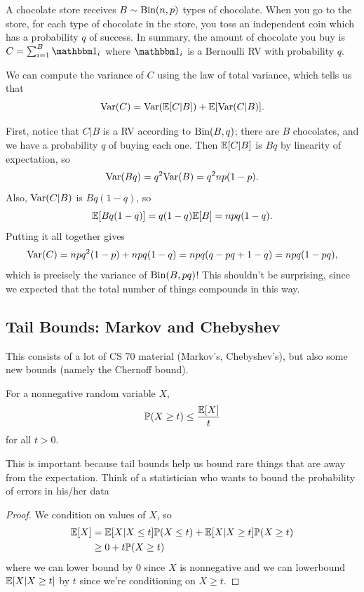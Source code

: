 \documentclass[11 pt]{scrartcl}
\begin{document}
\begin{example}
    A chocolate store receives $B\sim \text{Bin}(n,p)$ types of chocolate. When you go to the store, for each type of chocolate in the store, you toss an independent coin which has a probability $q$ of success. In summary, the amount of chocolate you buy is $C = \sum_{i = 1}^B \one_i$ where $\one_i$ is a Bernoulli RV with probability $q$. 

    We can compute the variance of $C$ using the law of total variance, which tells us that 
    \[ \text{Var}(C) = \text{Var}(\mathbb E[C|B]) + \mathbb E[\text{Var}(C|B)].\] 
    
    First, notice that $C|B$ is a RV according to $\text{Bin}(B, q)$; there are $B$ chocolates, and we have a probability $q$ of buying each one. Then $\mathbb E[C|B]$ is $Bq$ by linearity of expectation, so 
    \[ \text{Var}(Bq) = q^2\text{Var}(B) = q^2np(1-p).\] 
    Also, $\text{Var}(C|B)$ is $Bq(1-q)$, so 
    \[ \mathbb E[Bq(1-q)] = q(1-q)\mathbb E[B] = npq(1-q).\] 
    Putting it all together gives 
    \[ \text{Var}(C) = npq^2(1-p) + npq(1-q) = npq(q-pq + 1-q) = npq(1-pq),\]
    which is precisely the variance of $\text{Bin}(B, pq)$! This shouldn't be surprising, since we expected that the total number of things compounds in this way. 
\end{example}

\subsection{Tail Bounds: Markov and Chebyshev}
This consists of a lot of CS 70 material (Markov's, Chebyshev's), but also some new bounds (namely the Chernoff bound). 

\begin{theorem}
    For a nonnegative random variable $X$, 
    \[ \mathbb P(X \geq t) \leq \dfrac{\mathbb E[X]}{t}\] 
    for all $t > 0$. 
\end{theorem}

This is important because tail bounds help us bound rare things that are away from the expectation. Think of a statistician who wants to bound the probability of errors in his/her data
\begin{proof}
    We condition on values of $X$, so 
    \begin{align*}
        \mathbb E[X] &= \mathbb E[X | X \leq t] \mathbb P(X\leq t) + \mathbb E[X | X \geq t]\mathbb P(X\geq t) \\ 
               &\geq 0 + t \mathbb P(X\geq t)
    \end{align*}
    where we can lower bound by $0$ since $X$ is nonnegative and we can lowerbound $\mathbb E[X|X\geq t]$ by $t$ since we're conditioning on $X\geq t$. 
\end{proof}
\end{document}
